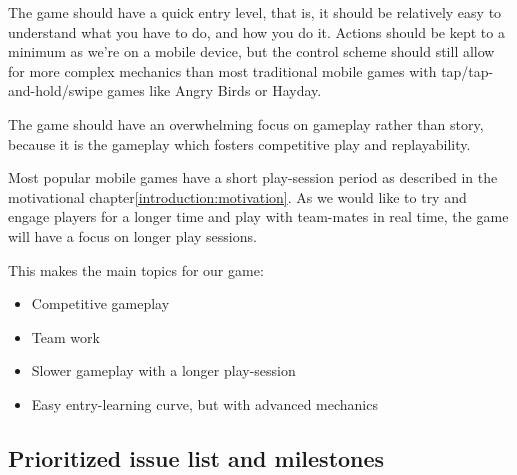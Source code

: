 The game should have a quick entry level, 	that is, it should be relatively easy to understand what you have to do, and how you do it. Actions should be kept to a minimum as we're on a mobile device, but the control scheme should still allow for more complex mechanics than most traditional mobile games with tap/tap-and-hold/swipe games like Angry Birds\cite{angrybirds} or Hayday\cite{hayday}. 

The game should have an overwhelming focus on gameplay rather than story, because it is the gameplay which fosters competitive play and replayability. 

Most popular mobile games have a short play-session period as described in the motivational chapter\ref{introduction:motivation}. As we would like to try and engage players for a longer time and play with team-mates in real time, the game will have a focus on longer play sessions.

This makes the main topics for our game:
\begin{itemize}
\item Competitive gameplay
\item Team work
\item Slower gameplay with a longer play-session
\item Easy entry-learning curve, but with advanced mechanics
\end{itemize}

\subsection{Prioritized issue list and milestones}